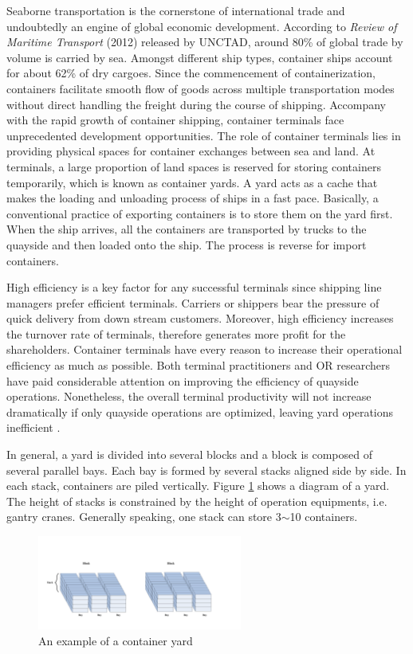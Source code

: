\documentclass[review,3p,times,authoryear,12pt]{elsarticle}
\begin{document}
Seaborne transportation is the cornerstone of international trade and undoubtedly an engine of global economic development. According to \textit{Review of Maritime Transport} (2012) released by UNCTAD, around 80\% of global trade by volume is carried by sea. Amongst different ship types, container ships account for about 62\% of dry cargoes. Since the commencement of containerization, containers facilitate smooth flow of goods across multiple transportation modes without direct handling the freight during the course of shipping. Accompany with the rapid growth of container shipping, container terminals face unprecedented development opportunities.
The role of container terminals lies in providing physical spaces for container exchanges between sea and land. At terminals, a large proportion of land spaces is reserved for storing containers temporarily, which is known as container yards. A yard acts as a cache that makes the loading and unloading process of ships in a fast pace. Basically, a conventional practice of exporting containers is to store them on the yard first. When the ship arrives, all the containers are transported by trucks to the quayside and then loaded onto the ship. The process is reverse for import containers.

High efficiency is a key factor for any successful terminals since shipping line managers prefer efficient terminals. Carriers or shippers bear the pressure of quick delivery from down stream customers. Moreover, high efficiency increases the turnover rate of terminals, therefore generates more profit for the shareholders. Container terminals have every reason to increase their operational efficiency as much as possible. Both terminal practitioners and OR researchers have paid considerable attention on improving the efficiency of quayside operations. Nonetheless, the overall terminal productivity will not increase dramatically if only quayside operations are optimized, leaving yard operations inefficient \citep{Jiang2012}.

In general, a yard is divided into several blocks and a block is composed of several parallel bays. Each bay is formed by several stacks aligned side by side. In each stack, containers are piled vertically. Figure \ref{fig:1} shows a diagram of a yard. The height of stacks is constrained by the height of operation equipments, i.e. gantry cranes. Generally speaking, one stack can store 3$\sim$10 containers.

\begin{figure}[htbp]
\centering
\includegraphics[width=0.60\textwidth]{fig1.pdf}
\caption{An example of a container yard}
\label{fig:1}
\end{figure}
\end{document}
